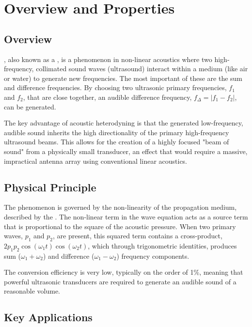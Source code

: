 \section{Overview and Properties}

\subsection{Overview}

, also known as a , is a phenomenon in non-linear acoustics where two high-frequency, collimated sound waves (ultrasound) interact within a medium (like air or water) to generate new frequencies. The most important of these are the sum and difference frequencies. By choosing two ultrasonic primary frequencies, $f_1$ and $f_2$, that are close together, an audible difference frequency, $f_{\Delta} = |f_1 - f_2|$, can be generated.

\begin{keyconcept}
    The key advantage of acoustic heterodyning is that the generated low-frequency, audible sound inherits the high directionality of the primary high-frequency ultrasound beams. This allows for the creation of a highly focused "beam of sound" from a physically small transducer, an effect that would require a massive, impractical antenna array using conventional linear acoustics.
\end{keyconcept}


\subsection{Physical Principle}

The phenomenon is governed by the non-linearity of the propagation medium, described by the . The non-linear term in the wave equation acts as a source term that is proportional to the square of the acoustic pressure. When two primary waves, $p_1$ and $p_2$, are present, this squared term contains a cross-product, $2p_1p_2\cos(\omega_1 t)\cos(\omega_2 t)$, which through trigonometric identities, produces sum ($\omega_1+\omega_2$) and difference ($\omega_1-\omega_2$) frequency components.

The conversion efficiency is very low, typically on the order of 1\%, meaning that powerful ultrasonic transducers are required to generate an audible sound of a reasonable volume.


\subsection{Key Applications}

